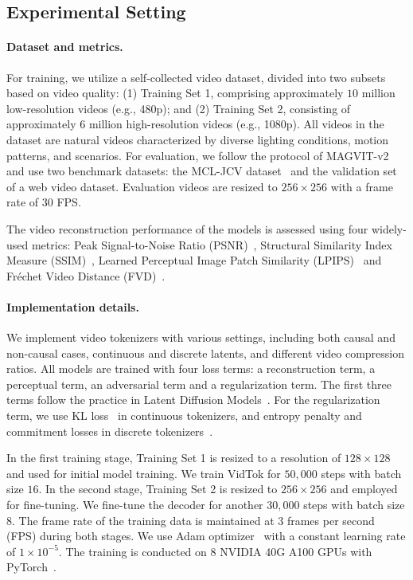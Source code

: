 \documentclass{article} %
\begin{document}
\subsection{Experimental Setting}

\paragraph{Dataset and metrics.}
For training, we utilize a self-collected video dataset, divided into two subsets based on video quality: (1) Training Set 1, comprising approximately $10$ million low-resolution videos (e.g., 480p); and (2) Training Set 2, consisting of approximately $6$ million high-resolution videos (e.g., 1080p). All videos in the dataset are natural videos characterized by diverse lighting conditions, motion patterns, and scenarios. For evaluation, we follow the protocol of MAGVIT-v2~\citep{yu2024language} and use two benchmark datasets: the MCL-JCV dataset~\citep{wang2016mcl} and the validation set of a web video dataset. Evaluation videos are resized to $256\times256$ with a frame rate of $30$ FPS.

The video reconstruction performance of the models is assessed using four widely-used metrics: Peak Signal-to-Noise Ratio (PSNR)~\citep{hore2010image}, Structural Similarity Index Measure (SSIM)~\citep{wang2004image}, Learned Perceptual Image Patch Similarity (LPIPS)~\citep{zhang2018unreasonable} and Fréchet Video Distance (FVD)~\citep{unterthiner2018towards}.

\paragraph{Implementation details.}
We implement video tokenizers with various settings, including both causal and non-causal cases, continuous and discrete latents, and different video compression ratios.
All models are trained with four loss terms: a reconstruction term, a perceptual term, an adversarial term and a regularization term. The first three terms follow the practice in Latent Diffusion Models~\citep{rombach2022high}. For the regularization term, we use KL loss~\citep{Kingma2014} in continuous tokenizers, and entropy penalty and commitment losses in discrete tokenizers~\citep{yu2024language}.

In the first training stage, Training Set 1 is resized to a resolution of $128\times128$ and used for initial model training. We train VidTok for $50,000$ steps with batch size $16$. In the second stage, Training Set 2 is resized to $256\times256$ and employed for fine-tuning. We fine-tune the decoder for another $30,000$ steps with batch size $8$. The frame rate of the training data is maintained at $3$ frames per second (FPS) during both stages. We use Adam optimizer~\citep{kingma2014adam} with a constant learning rate of $1 \times 10^{-5}$. The training is conducted on $8$ NVIDIA 40G A100 GPUs with PyTorch~\citep{paszke2019pytorch}.
\end{document}
